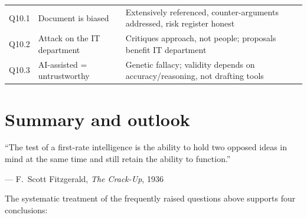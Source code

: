 \begin{longtable}{>{\raggedright}p{1cm} >{\raggedright}p{5.5cm} >{\raggedright\arraybackslash}p{7.5cm}}
\addlinespace
Q10.1 & Document is biased & Extensively referenced, counter-arguments addressed, risk register honest \\
\addlinespace
Q10.2 & Attack on the IT department & Critiques approach, not people; proposals benefit IT department \\
\addlinespace
Q10.3 & AI-assisted = untrustworthy & Genetic fallacy; validity depends on accuracy/reasoning, not drafting tools \\

\end{longtable}

\section{Summary and outlook}
\label{sec:arg-conclusion}

\epigraph{``The test of a first-rate intelligence is the ability to hold two opposed ideas in mind at the same time and still retain the ability to function.''}{--- F.\ Scott Fitzgerald, \textit{The Crack-Up}, 1936}

The systematic treatment of the frequently raised questions above supports four conclusions:

